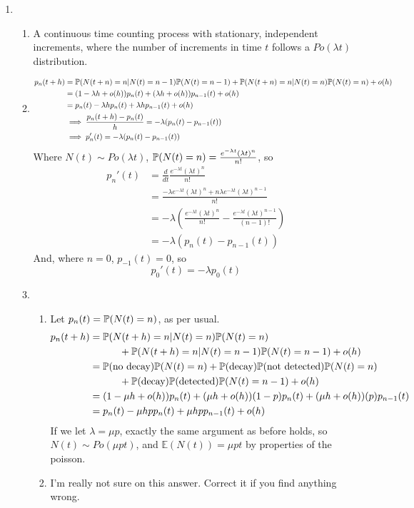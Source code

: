 \documentclass{article}
\begin{document}
\begin{enumerate}
\begin{enumerate}
\end{enumerate}
\clearpage
\item
\begin{enumerate}
\item
A continuous time counting process with stationary, independent increments,
where the number of increments in time $t$ follows a $Po(\lambda t)$
distribution.
\item
\begin{align*}
p_n(t+h) &= \mathbb{P}(N(t+n)=n | N(t) = n-1)\mathbb{P}(N(t)=n-1) + \mathbb{P}(N(t+n)=n | N(t) =
n)\mathbb{P}(N(t)=n) + o(h) \\
&= (1-\lambda h +o(h))p_n(t) + (\lambda h + o(h))p_{n-1}(t) + o(h)\\
&= p_n(t) -\lambda h p_n(t) + \lambda h p_{n-1}(t) + o(h)\\
&\implies \frac{p_n(t+h)-p_n(t)}{h} = -\lambda(p_n(t)-p_{n-1}(t))\\
&\implies p_n'(t) = -\lambda(p_n(t)-p_{n-1}(t))
\end{align*}
Where $N(t) \sim Po(\lambda t)$, $\mathbb{P}(N(t)=n) = \frac{e^{-\lambda t}(\lambda 
t)^n}{n!}$, so
\begin{align*}
p_n'(t) &= \frac{d}{dt} \frac{e^{-\lambda t}(\lambda t)^n}{n!}\\
&= \frac{-\lambda e^{-\lambda t}(\lambda t)^n + n \lambda e^{-\lambda t}(\lambda
t)^{n-1}}{n!}\\
&= -\lambda \left( \frac{e^{-\lambda t}(\lambda t)^n}{n!} - \frac{e^{-\lambda 
t}(\lambda t)^{n-1}}{(n-1)!}\right)\\
&= -\lambda(p_n(t) - p_{n-1}(t))
\end{align*}
And, where $n=0$, $p_{-1}(t) = 0$, so 
$$
p_0'(t) = -\lambda p_0(t)
$$
\item
\begin{enumerate}
\item
Let $p_n(t) = \mathbb{P}(N(t) = n)$, as per usual.
\begin{align*}
p_n(t+h) &= \mathbb{P}(N(t+h) = n | N(t) = n)\mathbb{P}(N(t)=n) \\
&\quad \quad \quad + \mathbb{P}(N(t+h)=n|N(t)=n-1)\mathbb{P}(N(t)=n-1)+o(h)\\
&=\mathbb{P}(\mbox{no decay})\mathbb{P}(N(t)=n) + \mathbb{P}(\mbox{decay})\mathbb{P}(\mbox{not
detected})\mathbb{P}(N(t)=n)
\\ & \quad \quad \quad +
\mathbb{P}(\mbox{decay})\mathbb{P}(\mbox{detected})\mathbb{P}(N(t)=n-1)+o(h)\\
&= (1-\mu h + o(h))p_n(t) + (\mu h + o(h))(1-p)p_n(t) + (\mu
h+o(h))(p)p_{n-1}(t)\\
&= p_n(t)-\mu h p p_n(t) + \mu h p p_{n-1}(t) +o(h)
\end{align*}
If we let $\lambda = \mu p$, exactly the same argument as before holds, so 
$N(t)\sim Po(\mu p t)$, and $\mathbb{E}(N(t)) = \mu p t$ by properties of the
poisson.
\item
I'm really not sure on this answer. Correct it if you find anything wrong.


\end{enumerate}
\end{enumerate}
\end{enumerate}
\end{document}
